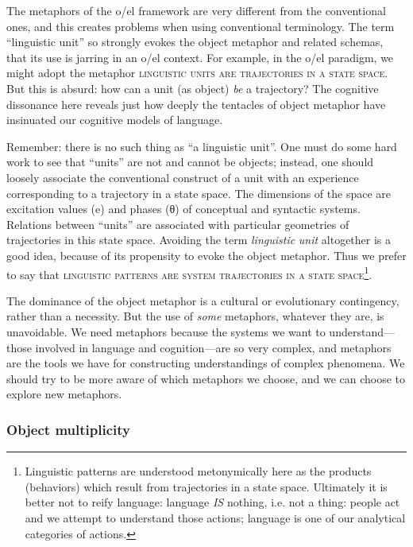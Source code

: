   The metaphors of the o/el framework are very different from the conventional ones, and this creates problems when using conventional terminology. The term “linguistic unit” so strongly evokes the object metaphor and related schemas, that its use is jarring in an o/el context. For example, in the o/el paradigm, we might adopt the metaphor \textsc{linguistic} \textsc{units} \textsc{are} \textsc{trajectories} \textsc{in} \textsc{a} \textsc{state} \textsc{space}. But this is absurd: how can a unit (as object) \textit{be} a trajectory? The cognitive dissonance here reveals just how deeply the tentacles of object metaphor have insinuated our cognitive models of language.

  Remember: there is no such thing as “a linguistic unit”. One must do some hard work to see that “units” are not and cannot be objects; instead, one should loosely associate the conventional construct of a unit with an experience corresponding to a trajectory in a state space. The dimensions of the space are excitation values (e) and phases (θ) of conceptual and syntactic systems. Relations between “units” are associated with particular geometries of trajectories in this state space. Avoiding the term \textit{linguistic} \textit{unit} altogether is a good idea, because of its propensity to evoke the object metaphor. Thus we prefer to say that \textsc{linguistic} \textsc{patterns} \textsc{are} \textsc{system} \textsc{trajectories} \textsc{in} \textsc{a} \textsc{state} \textsc{space}\footnote{Linguistic patterns are understood metonymically here as the products (behaviors) which result from trajectories in a state space. Ultimately it is better not to reify language: language \textit{IS} nothing, i.e. not a thing: people act and we attempt to understand those actions; language is one of our analytical categories of actions.}.

  The dominance of the object metaphor is a cultural or evolutionary contingency, rather than a necessity. But the use of \textit{some} metaphors, whatever they are, is unavoidable. We need metaphors because the systems we want to understand—those involved in language and cognition—are so very complex, and metaphors are the tools we have for constructing understandings of complex phenomena. We should try to be more aware of which metaphors we choose, and we can choose to explore new metaphors.

\subsubsection{Object multiplicity}

